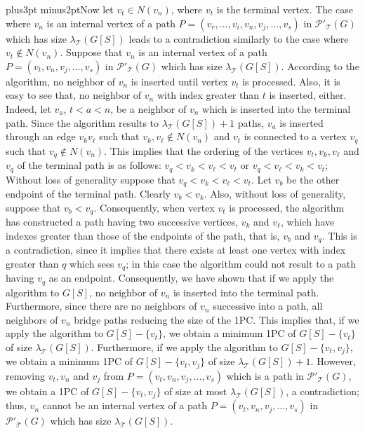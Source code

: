 \documentclass[10pt]{article}
\def\yskip{\penalty-50\vskip3pt plus3pt minus2pt}
\def\y{\yskip}
\begin{document}
{\y Now let $v_t \in N(v_n)$, where $v_t$ is the terminal vertex.
The case where $v_n$ is an internal vertex of a path $P=(v_r,
\ldots, v_i, v_n, v_j, \ldots, v_s)$ in
$\mathcal{P'_{\mathcal{T}}}(G)$ which has size
$\lambda_\mathcal{T}(G[S])$ leads to a contradiction similarly to
the case where $v_t \notin N(v_n)$. Suppose that $v_n$ is an
internal vertex of a path $P=(v_t, v_n, v_j, \ldots, v_s)$ in
$\mathcal{P'_{\mathcal{T}}}(G)$ which has size
$\lambda_\mathcal{T}(G[S])$. According to the algorithm, no
neighbor of $v_n$ is inserted until vertex $v_t$ is processed.
Also, it is easy to see that, no neighbor of $v_n$ with index
greater than $t$ is inserted, either. Indeed, let $v_a$, $t<a<n$,
be a neighbor of $v_n$ which is inserted into the terminal path.
Since the algorithm results to $\lambda_\mathcal{T}(G[S])+1$
paths, $v_a$ is inserted through an edge $v_kv_\ell$ such that
$v_k,v_\ell \notin N(v_n)$ and $v_t$ is connected to a vertex
$v_q$ such that $v_q \notin N(v_n)$. This implies that the
ordering of the vertices $v_t, v_k, v_\ell$ and $v_q$ of the
terminal path is as follows: $v_q<v_k<v_\ell<v_t$ or
$v_q<v_\ell<v_k<v_t$; Without loss of generality suppose that
$v_q<v_k<v_\ell<v_t$. Let $v_b$ be the other endpoint of the
terminal path. Clearly $v_b<v_k$. Also, without loss of
generality, suppose that $v_b<v_q$. Consequently, when vertex
$v_t$ is processed, the algorithm has constructed a path having
two successive vertices, $v_k$ and $v_\ell$, which have indexes
greater than those of the endpoints of the path, that is, $v_b$
and $v_q$. This is a contradiction, since it implies that there
exists at least one vertex with index greater than $q$ which sees
$v_q$; in this case the algorithm could not result to a path
having $v_q$ as an endpoint. Consequently, we have shown that if
we apply the algorithm to $G[S]$, no neighbor of $v_n$ is inserted
into the terminal path. Furthermore, since there are no neighbors
of $v_n$ successive into a path, all neighbors of $v_n$ bridge
paths reducing the size of the 1PC. This implies that, if we apply
the algorithm to $G[S]-\{v_t\}$, we obtain a minimum 1PC of
$G[S]-\{v_t\}$ of size $\lambda_\mathcal{T}(G[S])$. Furthermore,
if we apply the algorithm to $G[S]-\{v_t,v_j\}$, we obtain a
minimum 1PC of $G[S]-\{v_t,v_j\}$ of size
$\lambda_\mathcal{T}(G[S])+1$. However, removing $v_t, v_n$ and
$v_j$ from $P=(v_t, v_n, v_j, \ldots, v_s)$ which is a path in
$\mathcal{P'_{\mathcal{T}}}(G)$, we obtain a 1PC of
$G[S]-\{v_t,v_j\}$ of size at most $\lambda_\mathcal{T}(G[S])$, a
contradiction; thus, $v_n$ cannot be an internal vertex of a path
$P=(v_t, v_n, v_j, \ldots, v_s)$ in
$\mathcal{P'_{\mathcal{T}}}(G)$ which has size
$\lambda_\mathcal{T}(G[S])$.

}
\end{document}
